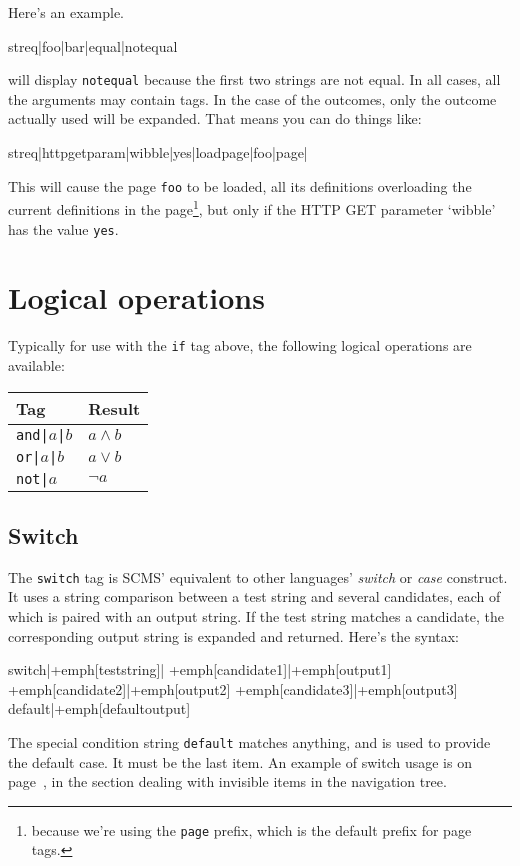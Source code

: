 \noindent Here's an example.
\begin{MyVerbatim}
{{streq|foo|bar|equal|notequal}}
\end{MyVerbatim}
will display \texttt{notequal} because the first two strings are not
equal.
In all cases, all the arguments may contain tags. In the case of the outcomes,
only the outcome actually used will be expanded. That means you can
do things like:
\begin{MyVerbatim}
{{streq|{{httpgetparam|wibble}}|yes|{{loadpage|foo|page}}|}}
\end{MyVerbatim}
This will cause the page \texttt{foo} to be loaded, all its definitions
overloading the current definitions in the page\footnote{because we're
using the \texttt{page} prefix, which is the default prefix for page 
tags.}, but only if the HTTP GET parameter `wibble' has the value \texttt{yes}.

\clearpage
\section{Logical operations}
Typically for use with the \texttt{if} tag above, the following logical
operations are available:
\begin{center}
\begin{tabular}{ll}
\textbf{Tag} & \textbf{Result} \\
\hline
\texttt{and|$a$|$b$} & $a \wedge b$ \\
\texttt{or|$a$|$b$} & $a \vee b$ \\
\texttt{not|$a$} & $\neg a$ \\
\end{tabular}
\end{center}
\subsection{Switch}
The \texttt{switch} tag is SCMS' equivalent to other languages' \emph{switch} or \emph{case} construct.
It uses a string comparison between a test string and several candidates, each of which is paired with
an output string. If the test string matches a candidate, the corresponding output string is expanded
and returned. Here's the syntax:
\begin{MyVerbatim}[commandchars=+\[\]]
{{switch|+emph[teststring]|
    +emph[candidate1]|+emph[output1]
    +emph[candidate2]|+emph[output2]
    +emph[candidate3]|+emph[output3]
    default|+emph[defaultoutput]}}
\end{MyVerbatim}
The special condition string \texttt{default} matches anything, and is used to provide the default case.
It must be the last item. An example of switch usage is on page~\pageref{invisitems}, in the section
dealing with invisible items in the navigation tree.

